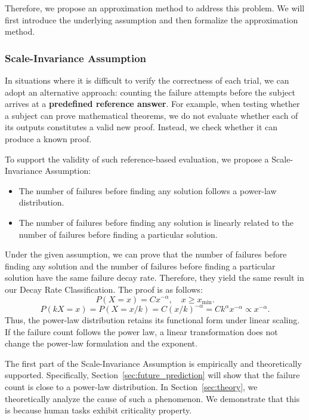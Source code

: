Therefore, we propose an approximation method to address this problem. We will first introduce the underlying assumption and then formalize the approximation method.

\subsubsection{Scale-Invariance Assumption}


In situations where it is difficult to verify the correctness of each trial, we can adopt an alternative approach: counting the failure attempts before the subject arrives at a \textbf{predefined reference answer}.
For example, when testing whether a subject can prove mathematical theorems, we do not evaluate whether each of its outputs constitutes a valid new proof. Instead, we check whether it can produce a known proof.

To support the validity of such reference-based evaluation, we propose a Scale-Invariance Assumption:
\begin{itemize}
	\item The number of failures before finding any solution follows a power-law distribution.
	\item The number of failures before finding any solution is linearly related to the number of failures before finding a particular solution. 
\end{itemize}

Under the given assumption, we can prove that the number of failures before finding any solution and the number of failures before finding a particular solution have the same failure decay rate. Therefore, they yield the same result in our Decay Rate Classification. The proof is as follows:
\begin{equation}
    P(X = x) = C x^{-\alpha}, \quad x \geq x_{\text{min}}.
\end{equation}
\begin{equation}
    P(kX = x) = P(X = x/k) = C (x/k)^{-\alpha} = C k^{\alpha} x^{-\alpha} \propto x^{-\alpha}.
\end{equation}
Thus, the power-law distribution retains its functional form under linear scaling.
If the failure count follows the power law, a linear transformation does not change the power-law formulation and the exponent.

The first part of the Scale-Invariance Assumption is empirically and theoretically supported.
Specifically, Section~\ref{sec:future_prediction} will show that the failure count is close to a power-law distribution. In Section~\ref{sec:theory}, we theoretically analyze the cause of such a phenomenon. We demonstrate that this is because human tasks exhibit criticality property.

